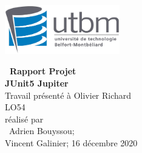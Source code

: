 \thispagestyle{empty}	%
\includegraphics[width=5cm]{logo.jpg}	%
\vspace{4cm}	%
\begin{center}	%
{\huge \bf\ Rapport Projet \\ JUnit5 Jupiter}  \\	%
\vspace{4cm}
\large Travail présenté à Olivier Richard \\ LO54\\
\vspace{4cm}
réalisé par \\ \ Adrien Bouyssou;\\ Vincent Galinier;
\vfill	%
16 décembre 2020
\pagebreak
\end{center}